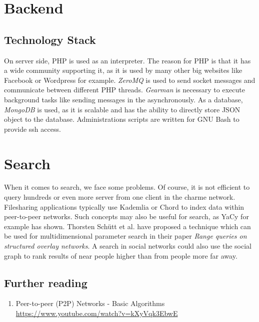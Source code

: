 \documentclass{scrartcl}
\begin{document}
 \section{Backend}
\subsection{Technology Stack}
On server side, PHP is used as an interpreter. The reason for PHP is that it has a wide community supporting it, as it is used by many other big websites like Facebook or Wordpress for example. \textit{ZeroMQ} is used to send socket messages and communicate between different PHP threads. \textit{Gearman} is necessary to execute background tasks like sending messages in the asynchronously. As a database, \textit{MongoDB} is used, as it is scalable and has the ability to directly store JSON object to the database.
Administrations scripts are written for GNU Bash to provide ssh access.


  \section{Search}
  When it comes to search, we face some problems. Of course, it is not efficient to query hundreds or even more server from one client in the charme network. Filesharing applications typically use Kademlia  or Chord to index data within peer-to-peer networks. Such concepts may also be useful for search, as YaCy for example has shown. Thorsten Schütt et al. have proposed a technique which can be used for multidimensional parameter search in their paper \textit{Range queries on structured overlay networks}. A search in social networks could also use the social graph to rank results of near people higher than from people more far away.
  


\subsection{Further reading}
\begin{enumerate}
\item Peer-to-peer (P2P) Networks - Basic Algorithms \\\url{https://www.youtube.com/watch?v=kXyVqk3EbwE} %
\end{enumerate}
\end{document}
